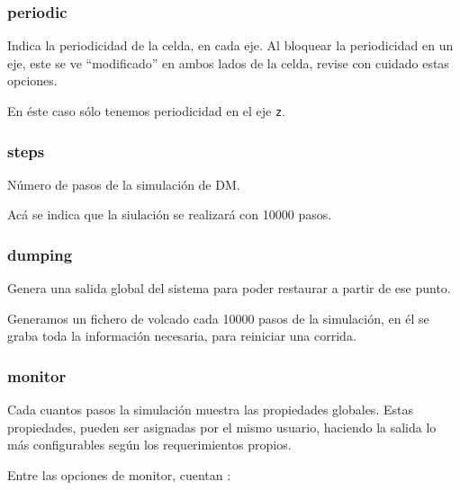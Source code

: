 \subsubsection{periodic}
Indica la periodicidad de la celda, en cada eje. Al bloquear la periodicidad en un eje, este se ve ``modificado'' en ambos lados de la celda, revise con cuidado estas opciones.


En \'este caso s\'olo tenemos periodicidad en el eje \verb|z|.

\subsubsection{steps}
N\'umero de pasos de la simulaci\'on de DM.


Ac\'a se indica que la siulaci\'on se realizar\'a con 10000 pasos.

\subsubsection{dumping}
Genera una salida global del sistema para poder restaurar a partir de ese punto.


Generamos un fichero de volcado cada 10000 pasos de la simulaci\'on, en \'el se graba toda la informaci\'on necesaria, para reiniciar una corrida.

\subsubsection{monitor}
Cada cuantos pasos la simulaci\'on muestra las propiedades globales. Estas propiedades, pueden ser asignadas por el mismo usuario, haciendo la salida lo m\'as configurables seg\'un los requerimientos propios.

Entre las opciones de monitor, cuentan :


